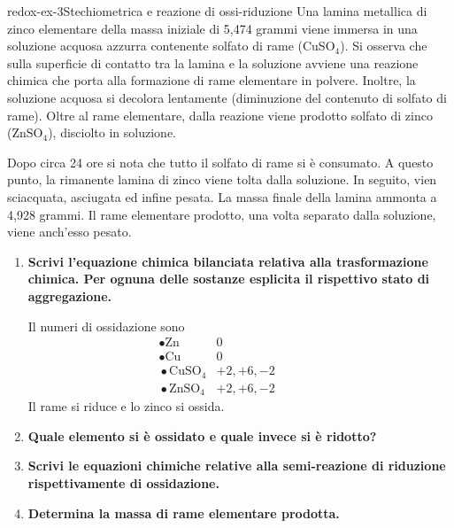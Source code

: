\documentclass[preview]{standalone}
\begin{document}
\begin{snippetexercise}{redox-ex-3}{Stechiometrica e reazione di ossi-riduzione}
    Una lamina metallica di zinco elementare della massa iniziale
    di 5,474 grammi viene immersa in una soluzione
    acquosa azzurra contenente solfato di rame
    (CuSO\({}_4\)).
    Si osserva che sulla superficie di contatto
    tra la lamina e la soluzione avviene una reazione
    chimica che porta alla formazione
    di rame elementare in polvere.
    Inoltre, la soluzione acquosa si decolora lentamente
    (diminuzione del contenuto di solfato di rame).
    Oltre al rame elementare,
    dalla reazione viene prodotto solfato di zinco
    (ZnSO\({}_4\)), disciolto in soluzione.

    Dopo circa 24 ore si nota che tutto il solfato di rame si è consumato.
    A questo punto, la rimanente lamina di zinco viene tolta dalla soluzione. In seguito,
    vien sciacquata, asciugata ed infine pesata.
    La massa finale della lamina ammonta a 4,928 grammi.
    Il rame elementare prodotto, una volta separato
    dalla soluzione, viene anch'esso pesato.

    \begin{enumerate}
        \item \textbf{Scrivi l'equazione chimica bilanciata relativa alla
        trasformazione chimica. Per ognuna delle sostanze esplicita
        il rispettivo stato di aggregazione.}

        Il numeri di ossidazione sono
        \begin{align*}
            &\,\bullet \text{Zn} & 0 &&&&&&\\
            &\,\bullet \text{Cu} & 0 &&&&&&\\
            &\,\bullet \text{CuSO}_4 & +2, +6, -2 &&&&&&\\
            &\,\bullet \text{ZnSO}_4 & +2, +6, -2 &&&&&&
        \end{align*}
        Il rame si riduce e lo zinco si ossida.

        \item \textbf{Quale elemento si è ossidato e quale invece si è ridotto?}

        \item \textbf{Scrivi le equazioni chimiche relative alla semi-reazione
        di riduzione rispettivamente di ossidazione.}

        \item \textbf{Determina la massa di rame elementare prodotta.}


\end{enumerate}
\end{snippetexercise}
\end{document}

